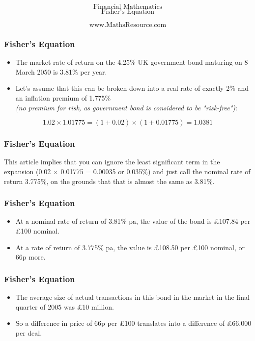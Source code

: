 \documentclass{beamer}
\begin{document}
	\begin{frame}
		\bigskip
		{
			\Huge
			\[ \mbox{Financial Mathematics}  \]
			\huge
			\[ \mbox{Fisher's Equation}  \]
		}
		
		{
			\LARGE
			\[ \mbox{www.MathsResource.com}  \]
		}
	\end{frame}

\begin{frame}
\frametitle{Fisher's Equation}
\Large
\begin{itemize}
\item The market rate of return on the 4.25\% UK government bond maturing on 8 March 2050 is 3.81\% per year. \item Let's assume that this can be broken down into a real rate of exactly 2\% and an inflation premium of 1.775\% \\ \textit{(no premium for risk, as government bond is considered to be "risk-free")}:
\end{itemize}
\[ 1.02 \times 1.01775 = (1 + 0.02) \times (1 + 0.01775) = 1.0381 \]

\end{frame}
	\begin{frame}
		\frametitle{Fisher's Equation}
This article implies that you can ignore the least significant term in the expansion (0.02 × 0.01775 = 0.00035 or 0.035\%) and just call the nominal rate of return 3.775\%, on the grounds that that is almost the same as 3.81\%.
\end{frame}

\begin{frame}
\frametitle{Fisher's Equation}
\Large
\begin{itemize}
\item At a nominal rate of return of 3.81\% pa, the value of the bond is £107.84 per £100 nominal. 
\item At a rate of return of 3.775\% pa, the value is £108.50 per £100 nominal, or 66p more.
\end{itemize}
\end{frame}

\begin{frame}
	\frametitle{Fisher's Equation}
	\Large
\begin{itemize}
	\item
The average size of actual transactions in this bond in the market in the final quarter of 2005 was £10 million. 
\item So a difference in price of 66p per £100 translates into a difference of £66,000 per deal.
\end{itemize}
\end{frame}
\end{document}
